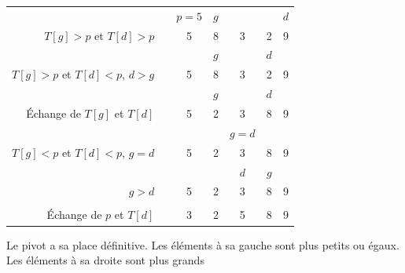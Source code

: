 \documentclass[10pt,fleqn]{article} %
\begin{document}
\begin{center}
\begin{tabular}{rc|c|c|c|c|c|}
\multicolumn{2}{c}{} & \multicolumn{1}{c}{$p=5$} & \multicolumn{1}{c}{$g$} & \multicolumn{2}{c}{}&  \multicolumn{1}{c}{$d$} \\
\cline{3-7}
$T[g]>p$ et $T[d]>p$&&\cellcolor{black!30}5 & \cellcolor{black!10}8 & 3 & 2 & \cellcolor{black!10}9 \\
\cline{3-7}
\multicolumn{2}{c}{} & 
\multicolumn{1}{c}{} & 
\multicolumn{1}{c}{$g$} & 
\multicolumn{1}{c}{}&  
\multicolumn{1}{c}{$d$}&  
\multicolumn{1}{c}{} \\
\cline{3-7}
$T[g]>p$ et $T[d]<p$, $d>g$ &&\cellcolor{black!30}5 & \cellcolor{black!10}8 & 3 & \cellcolor{black!10}2 & \cellcolor{black!10}9 \\
\cline{3-7}
\multicolumn{2}{c}{} & 
\multicolumn{1}{c}{} & 
\multicolumn{1}{c}{$g$} & 
\multicolumn{1}{c}{}&  
\multicolumn{1}{c}{$d$}&  
\multicolumn{1}{c}{} \\
\cline{3-7}
Échange de $T[g]$ et $T[d]$ &&\cellcolor{black!30}5 & \cellcolor{black!10}2 & 
3 & \cellcolor{black!10}8 & \cellcolor{black!10}9 \\
\cline{3-7}
\multicolumn{2}{c}{} & 
\multicolumn{1}{c}{} & 
\multicolumn{1}{c}{} & 
\multicolumn{1}{c}{$g=d$}&  
\multicolumn{1}{c}{}&  
\multicolumn{1}{c}{} \\
\cline{3-7}
$T[g]<p$ et $T[d]<p$, $g=d$ &&\cellcolor{black!30}5 & \cellcolor{black!10}2 & 
\cellcolor{black!10}3 & \cellcolor{black!10}8 & \cellcolor{black!10}9 \\
\cline{3-7}
\multicolumn{2}{c}{} & 
\multicolumn{1}{c}{} & 
\multicolumn{1}{c}{} & 
\multicolumn{1}{c}{$d$}&  
\multicolumn{1}{c}{$g$}&  
\multicolumn{1}{c}{} \\
\cline{3-7}
$g>d$ &&\cellcolor{black!30}5 & \cellcolor{black!10}2 & 
\cellcolor{black!10}3 & \cellcolor{black!10}8 & \cellcolor{black!10}9 \\
\cline{3-7}
\multicolumn{2}{c}{} & 
\multicolumn{1}{c}{} & 
\multicolumn{1}{c}{} & 
\multicolumn{1}{c}{}&  
\multicolumn{1}{c}{}&  
\multicolumn{1}{c}{} \\
\cline{3-7}
Échange de $p$ et $T[d]$ &&\cellcolor{black!10}3 & \cellcolor{black!10}2 & 
\cellcolor{black!30}5 & \cellcolor{black!10}8 & \cellcolor{black!10}9 \\
\cline{3-7}
\end{tabular}
\end{center}

Le pivot a sa place définitive. Les éléments à sa gauche sont plus petits ou égaux.
Les éléments à sa droite sont plus grands
\end{document}
